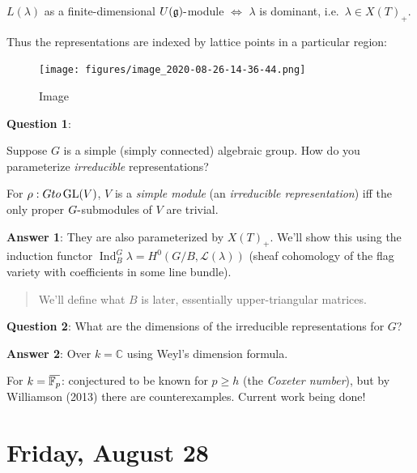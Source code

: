\begin{theorem}[?]

\begin{theorem}[?]

\(L(\lambda)\) as a finite-dimensional
\(U({\mathfrak{g}}){\hbox{-}}\)module \(\iff\) \(\lambda\) is dominant,
i.e.~\(\lambda \in X(T)_+\).

\end{theorem}

\end{theorem}

Thus the representations are indexed by lattice points in a particular
region:

\begin{figure}
\centering
\texttt{[image: figures/image\_2020-08-26-14-36-44.png]}
\caption{Image}
\end{figure}

\textbf{Question 1}:

Suppose \(G\) is a simple (simply connected) algebraic group. How do you
parameterize \emph{irreducible} representations?

For \(\rho: G\\to \operatorname{GL}(V)\), \(V\) is a \emph{simple
module} (an \emph{irreducible representation}) iff the only proper
\(G{\hbox{-}}\)submodules of \(V\) are trivial.

\textbf{Answer 1}: They are also parameterized by \(X(T)_+\). We'll show
this using the induction functor
\(\operatorname{Ind}_B^G \lambda =H^0(G/B, \mathcal{L}(\lambda))\)
(sheaf cohomology of the flag variety with coefficients in some line
bundle).

\begin{quote}
We'll define what \(B\) is later, essentially upper-triangular matrices.
\end{quote}

\textbf{Question 2}: What are the dimensions of the irreducible
representations for \(G\)?

\textbf{Answer 2}: Over \(k={\mathbb{C}}\) using Weyl's dimension
formula.

For
\(k = \mkern 1.5mu\overline{\mkern-1.5mu{\mathbb{F}}_p\mkern-1.5mu}\mkern 1.5mu\):
conjectured to be known for \(p\geq h\) (the \emph{Coxeter number}), but
by Williamson (2013) there are counterexamples. Current work being done!

\hypertarget{friday-august-28}{%
\section{Friday, August 28}\label{friday-august-28}}

